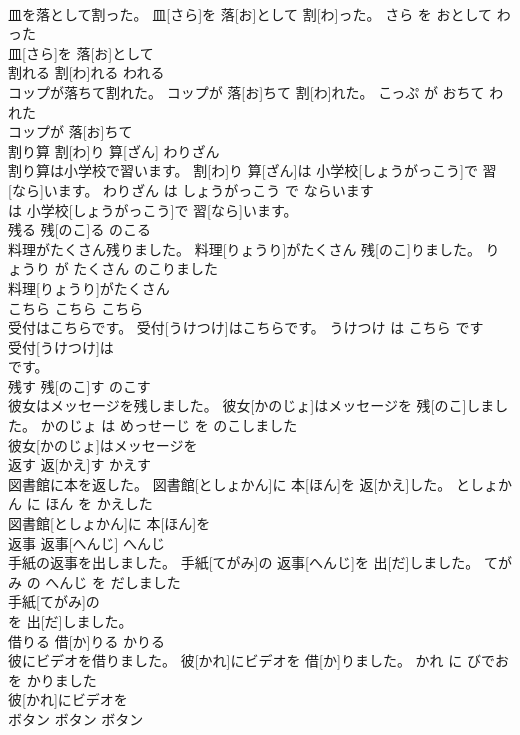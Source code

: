 \documentclass[8pt]{extreport}
\begin{document}
\begin{CJK}{UTF8}{min}
\\	皿を落として割った。	皿[さら]を 落[お]として 割[わ]った。	さら を おとして わった	
\\	皿[さら]を 落[お]として
\\	割れる	割[わ]れる	われる	
\\	コップが落ちて割れた。	コップが 落[お]ちて 割[わ]れた。	こっぷ が おちて われた	
\\	コップが 落[お]ちて
\\	割り算	割[わ]り 算[ざん]	わりざん	
\\	割り算は小学校で習います。	割[わ]り 算[ざん]は 小学校[しょうがっこう]で 習[なら]います。	わりざん は しょうがっこう で ならいます	
\\	は 小学校[しょうがっこう]で 習[なら]います。			
\\	残る	残[のこ]る	のこる	
\\	料理がたくさん残りました。	料理[りょうり]がたくさん 残[のこ]りました。	りょうり が たくさん のこりました	
\\	料理[りょうり]がたくさん
\\	こちら	こちら	こちら	
\\	受付はこちらです。	受付[うけつけ]はこちらです。	うけつけ は こちら です	
\\	受付[うけつけ]は
\\	です。			
\\	残す	残[のこ]す	のこす	
\\	彼女はメッセージを残しました。	彼女[かのじょ]はメッセージを 残[のこ]しました。	かのじょ は めっせーじ を のこしました	
\\	彼女[かのじょ]はメッセージを
\\	返す	返[かえ]す	かえす	
\\	図書館に本を返した。	図書館[としょかん]に 本[ほん]を 返[かえ]した。	としょかん に ほん を かえした	
\\	図書館[としょかん]に 本[ほん]を
\\	返事	返事[へんじ]	へんじ	
\\	手紙の返事を出しました。	手紙[てがみ]の 返事[へんじ]を 出[だ]しました。	てがみ の へんじ を だしました	
\\	手紙[てがみ]の
\\	を 出[だ]しました。			
\\	借りる	借[か]りる	かりる	
\\	彼にビデオを借りました。	彼[かれ]にビデオを 借[か]りました。	かれ に びでお を かりました	
\\	彼[かれ]にビデオを
\\	ボタン	ボタン	ボタン	

\end{CJK}
\end{document}
